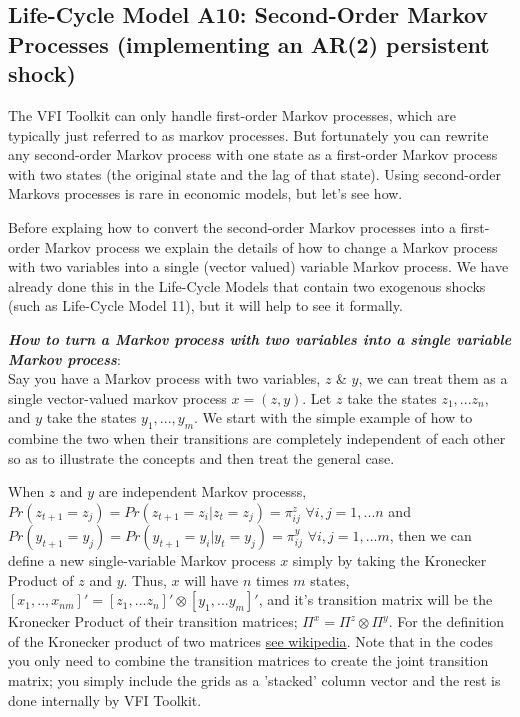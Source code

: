 \subsection{Life-Cycle Model A10: Second-Order Markov Processes (implementing an AR(2) persistent shock)}
The VFI Toolkit can only handle first-order Markov processes, which are typically just referred to as markov processes. But fortunately you can rewrite any second-order Markov process with one state as a first-order Markov process with two states (the original state and the lag of that state). Using second-order Markovs processes is rare in economic models, but let's see how.

Before explaing how to convert the second-order Markov processes into a first-order Markov process we explain the details of how to change a Markov process with two variables into a single (vector valued) variable  Markov process. We have already done this in the Life-Cycle Models that contain two exogenous shocks (such as Life-Cycle Model 11), but it will help to see it formally.

\textit{\textbf{How to turn a Markov process with two variables into a single variable Markov process}}:
\\ \noindent Say you have a Markov process with two variables, $z$ \& $y$, we can treat them as a single vector-valued markov process $x=(z,y)$. Let $z$ take the states $z_1,...z_n$, and $y$ take the states $y_1,...,y_m$. We start with the simple example of how to combine the two when their transitions are completely independent of each other so as to illustrate the concepts and then treat the general case.

When $z$ and $y$ are independent Markov processs, $Pr(z_{t+1}=z_j)=Pr(z_{t+1}=z_i | z_t=z_j)=\pi^z_{ij}$ $\forall i,j=1,...n$ and $Pr(y_{t+1}=y_j)=Pr(y_{t+1}=y_i | y_t=y_j)=\pi^y_{ij}$ $\forall i,j=1,...m$, then we can define a new single-variable Markov process $x$ simply by taking the Kronecker Product of $z$ and $y$. Thus, $x$ will have $n$ times $m$ states, $[x_1,..,x_{nm}]'=[z_1,...z_n]'\otimes[y_1,...y_m]'$, and it's transition matrix
will be the Kronecker Product of their transition matrices; $\Pi^x=\Pi^z \otimes \Pi^y$. For the definition of the Kronecker product of two matrices \href{https://en.wikipedia.org/wiki/Kronecker_product}{see wikipedia}. Note that in the codes you only need to combine the transition matrices to create the joint transition matrix; you simply include the grids as a 'stacked' column vector and the rest is done internally by VFI Toolkit.

